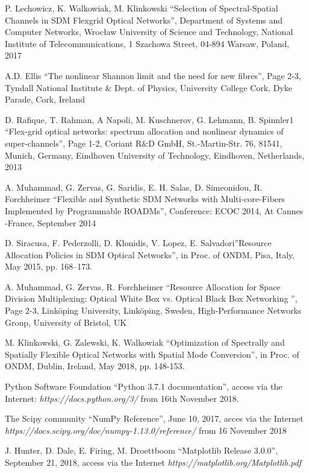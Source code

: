 \documentclass[conference]{IEEEtran}
\begin{document}
\begin{thebibliography}{00}

 P. Lechowicz, K. Walkowiak, M. Klinkowski ``Selection of Spectral-Spatial Channels in SDM
Flexgrid Optical Networks'', Department of Systems and Computer Networks, Wrocław University of Science and Technology, National Institute of Telecommunications, 1 Szachowa Street, 04-894 Warsaw, Poland, 2017

 A.D. Ellis ``The nonlinear Shannon limit and the need for new fibres'', Page 2-3, Tyndall National Institute \& Dept. of Physics, University College Cork, Dyke Parade, Cork, Ireland

 D. Rafique, T. Rahman, A Napoli, M. Kuschnerov, G. Lehmann, B. Spinnler1 ``Flex-grid optical networks: spectrum allocation and nonlinear dynamics of super-channels'', Page 1-2, Coriant R\&D GmbH, St.-Martin-Str. 76, 81541, Munich, Germany, Eindhoven University of Technology, Eindhoven, Netherlands, 2013

 A. Muhammad, G. Zervas, G. Saridis, E. H. Salas, D. Simeonidou, R. Forchheimer ``Flexible and Synthetic SDM Networks with Multi-core-Fibers Implemented by Programmable ROADMs'', Conference: ECOC 2014, At Cannes -France, September 2014

 D. Siracusa, F. Pederzolli, D. Klonidis, V. Lopez, E. Salvadori''Resource Allocation Policies in
SDM Optical Networks'',  in Proc. of ONDM, Pisa, Italy, May 2015, pp. 168–173.

 A. Muhammad, G. Zervas, R. Forchheimer ``Resource Allocation for Space Division Multiplexing: Optical White Box vs. Optical Black Box Networking '', Page 2-3, Linköping University, Linköping, Sweden, High-Performance Networks Group, University of Bristol, UK

 M. Klinkowski, G. Zalewski, K. Walkowiak ``Optimization of Spectrally and Spatially Flexible Optical Networks with Spatial Mode Conversion'', in Proc. of ONDM, Dublin, Ireland, May 2018, pp. 148-153.

 Python Software Foundation ``Python 3.7.1 documentation'', access via the Internet: \textit{https://docs.python.org/3/} from 16th November 2018.

 The Scipy community ``NumPy Reference'', June 10, 2017, acces via the Internet \textit{https://docs.scipy.org/doc/numpy-1.13.0/reference/} from 16 November 2018

 J. Hunter, D. Dale, E. Firing, M. Droettboom ``Matplotlib Release 3.0.0'', September 21, 2018, access via the Internet \textit{https://matplotlib.org/Matplotlib.pdf}


\end{thebibliography}
\vspace{12pt}
\end{document}
